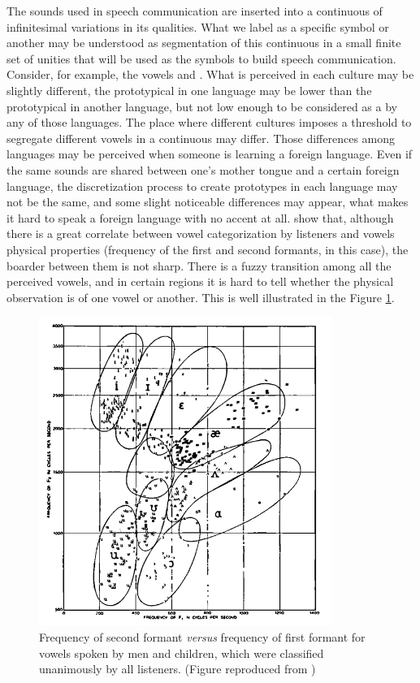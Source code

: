 The sounds used in speech communication are inserted into a continuous of infinitesimal variations in its qualities. What we label as a specific symbol or another may be understood as segmentation of this continuous in a small finite set of unities that will be used as the symbols to build speech communication. Consider, for example, the vowels \textipa{[e]} and \textipa{[E]}. What is perceived in each culture may be slightly different, the prototypical \textipa{[e]} in one language may be lower than the prototypical \textipa{[e]} in another language, but not low enough to be considered as a \textipa{[E]} by any of those languages. The place where different cultures imposes a threshold to segregate different vowels in a continuous may differ. Those differences among languages may be perceived when someone is learning a foreign language. Even if the same sounds are shared between one's mother tongue and a certain foreign language, the discretization process to create prototypes in each language may not be the same, and some slight noticeable differences may appear, what makes it hard to speak a foreign language with no accent at all. \cite{peterson} show that, although there is a great correlate between vowel categorization by listeners and vowels physical properties (frequency of the first and second formants, in this case), the boarder between them is not sharp. There is a fuzzy transition among all the perceived vowels, and in certain regions it is hard to tell whether the physical observation is of one vowel or another. This is well illustrated in the Figure \ref{fig:vowelsF1F2}.

\begin{figure}[h!]
\centering
\includegraphics[width=0.85\textwidth]{images/vowelsF1F2.png}
\caption{Frequency of second formant \textit{versus} frequency of first formant for vowels spoken by men and children, which were classified unanimously by all listeners. (Figure reproduced from \citep{peterson})}
\label{fig:vowelsF1F2}
\end{figure}  

